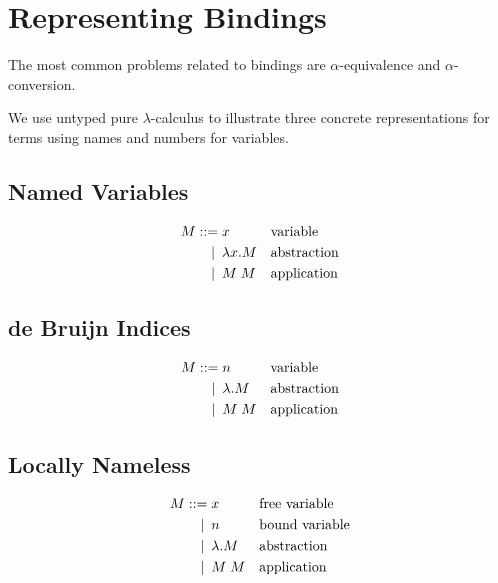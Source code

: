 \documentclass[a4paper,11pt]{article}
\begin{document}
\section{Representing Bindings}\label{sec:representing}

The most common problems related to bindings are $\alpha$-equivalence and
$\alpha$-conversion.

We use untyped pure $\lambda$-calculus to illustrate three concrete
representations for terms using names and numbers for variables.


\subsection{Named Variables}

\begin{align*}
  M ::=             &\; x
  && \text{variable} \\
  \llap{\textbar\:} &\; \lambda x.M
  && \text{abstraction} \\
  \llap{\textbar\:} &\; M \; M
  && \text{application} \\
\end{align*}


\subsection{de Bruijn Indices}

\begin{align*}
  M ::=             &\; n
  && \text{variable} \\
  \llap{\textbar\:} &\; \lambda .M
  && \text{abstraction} \\
  \llap{\textbar\:} &\; M \; M
  && \text{application} \\
\end{align*}


\subsection{Locally Nameless}

\begin{align*}
  M ::=             &\; x
  && \text{free variable} \\
  \llap{\textbar\:} &\; n
  && \text{bound variable} \\
  \llap{\textbar\:} &\; \lambda .M
    && \text{abstraction} \\
  \llap{\textbar\:} &\; M \; M
  && \text{application} \\
\end{align*}
\end{document}
